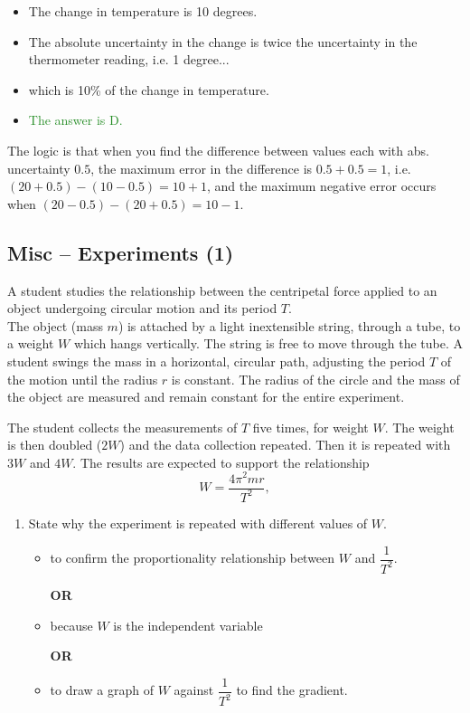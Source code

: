 \documentclass[a4paper,12pt]{article}
\let\oldsubsection\subsection
\renewcommand\subsection{\clearpage\oldsubsection}
\newcommand{\lb}{\\[8pt]}
\newcommand{\ans}[1]{\textcolor{ForestGreen}{The answer is #1.}}
\begin{document}
\begin{itemize}
  \item The change in temperature is 10 degrees.
  \item The absolute uncertainty in the change is twice the uncertainty in the thermometer reading, i.e. 1 degree...
  \item which is 10\% of the change in temperature.
  \item \ans{D}
\end{itemize}

The logic is that when you find the difference between values each with abs. uncertainty $0.5$, the maximum error in the difference is $0.5 + 0.5 = 1$, i.e. $(20 + 0.5) - (10 - 0.5) = 10 + 1$, and the maximum negative error occurs when $(20 - 0.5) - (20 + 0.5) = 10 - 1$.

\subsection{Misc -- Experiments (1)}

A student studies the relationship between the centripetal force applied to an object undergoing circular motion and its period \( T \).\lb
The object (mass \( m \)) is attached by a light inextensible string, through a tube, to a weight $W$ which hangs vertically. The string is free to move through the tube. A student swings the mass in a horizontal, circular path, adjusting the period $T$ of the motion until the radius \( r \) is constant. The radius of the circle and the mass of the object are measured and remain constant for the entire experiment.

The student collects the measurements of $T$ five times, for weight \( W \). The weight is then doubled (\( 2W \)) and the data collection repeated. Then it is repeated with \( 3W \) and \( 4W \). The results are expected to support the relationship
\[ W = \frac{4\pi^2mr}{T^2}, \]

\begin{enumerate}[label=(\alph*)]
  \item State why the experiment is repeated with different values of $W$.
        \begin{itemize}
          \item to confirm the proportionality relationship between $W$ and $\dfrac{1}{T^2}$.

                \textbf{OR}

          \item because $W$ is the independent variable




                \textbf{OR}

          \item to draw a graph of $W$ against $\dfrac{1}{T^2}$ to find the gradient.



        \end{itemize}
\end{enumerate}
\end{document}
